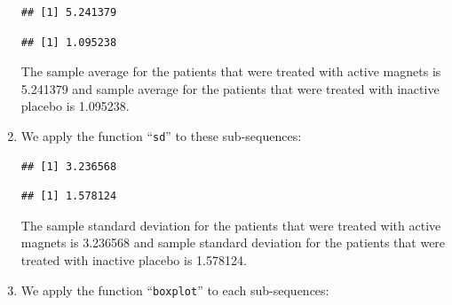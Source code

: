\documentclass[
]{krantz}
\makeatletter
\newenvironment{Shaded}{\begin{snugshade}}{\end{snugshade}}
\newcommand{\DecValTok}[1]{\textcolor[rgb]{0.00,0.00,0.81}{#1}}
\newcommand{\KeywordTok}[1]{\textcolor[rgb]{0.13,0.29,0.53}{\textbf{#1}}}
\newcommand{\NormalTok}[1]{#1}
\newcommand{\OperatorTok}[1]{\textcolor[rgb]{0.81,0.36,0.00}{\textbf{#1}}}
\newenvironment{kframe}{%
\medskip{}
\setlength{\fboxsep}{.8em}
 \def\at@end@of@kframe{}%
 \ifinner\ifhmode%
  \def\at@end@of@kframe{\end{minipage}}%
  \begin{minipage}{\columnwidth}%
 \fi\fi%
 \def\FrameCommand##1{\hskip\@totalleftmargin \hskip-\fboxsep
 \colorbox{shadecolor}{##1}\hskip-\fboxsep
     \hskip-\linewidth \hskip-\@totalleftmargin \hskip\columnwidth}%
 \MakeFramed {\advance\hsize-\width
   \@totalleftmargin\z@ \linewidth\hsize
   \@setminipage}}%
 {\par\unskip\endMakeFramed%
 \at@end@of@kframe}
\renewenvironment{Shaded}{\begin{kframe}}{\end{kframe}}
\theoremstyle{definition}
\theoremstyle{definition}
\theoremstyle{definition}
\theoremstyle{remark}
\makeatother
\begin{document}
\begin{enumerate}
\begin{verbatim}
## [1] 5.241379
\end{verbatim}

\begin{Shaded}
\end{Shaded}

\begin{verbatim}
## [1] 1.095238
\end{verbatim}

  The sample average for the patients that were treated with active
  magnets is 5.241379 and sample average for the patients that were
  treated with inactive placebo is 1.095238.
\item
  We apply the function ``\texttt{sd}'' to
  these sub-sequences:

\begin{Shaded}
\end{Shaded}

\begin{verbatim}
## [1] 3.236568
\end{verbatim}

\begin{Shaded}
\end{Shaded}

\begin{verbatim}
## [1] 1.578124
\end{verbatim}

  The sample standard deviation for the patients that were treated with
  active magnets is 3.236568 and sample standard deviation for the
  patients that were treated with inactive placebo is 1.578124.
\item
  We apply the function ``\texttt{boxplot}''
  to each sub-sequences:

\begin{Shaded}
\end{Shaded}


\end{enumerate}
\end{document}
